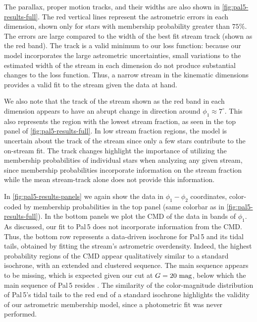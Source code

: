 \documentclass[twocolumn]{aastex631}
\newcommand{\stream}[1]{#1}
\begin{document}
        The parallax, proper motion tracks, and their widths are also shown in
        \autoref{fig:pal5-results-full}. The red vertical lines represent the
        astrometric errors in each dimension, shown only for stars with
        membership probability greater than $75\%$. The errors are large
        compared to the width of the best fit stream track (shown as the red
        band). The track is a valid minimum to our loss function: because our
        model incorporates the large astrometric uncertainties, small variations
        to the estimated width of the stream in each dimension do not produce
        substantial changes to the loss function. Thus, a narrow stream in the
        kinematic dimensions provides a valid fit to the stream given the data
        at hand. 
    
        We also note that the track of the stream shown as the red band in each
        dimension appears to have an abrupt change in direction around $\phi_1
        \approx 7^\circ$. This also represents the region with the lowest stream
        fraction, as seen in the top panel of \autoref{fig:pal5-results-full}.
        In low stream fraction regions, the model is uncertain about the track
        of the stream since only a few stars contribute to the on-stream fit.
        The track changes highlight the importance of utilizing the membership
        probabilities of individual stars when analyzing any given stream, since
        membership probabilities incorporate information on the stream fraction
        while the mean stream-track alone does not provide this information. 
    
        In \autoref{fig:pal5-results-panels} we again show the data in
        $\phi_1-\phi_2$ coordinates, color-coded by membership probabilities in
        the top panel (same colorbar as in \autoref{fig:pal5-results-full}). In
        the bottom panels we plot the CMD of the data in bands of $\phi_1$. As
        discussed, our fit to \stream{Pal\,5} does not incorporate information
        from the CMD.  Thus, the bottom row represents a data-driven isochrone
        for \stream{Pal\,5} and its tidal tails, obtained by fitting the
        stream's astrometric overdensity. Indeed, the highest probability
        regions of the CMD appear qualitatively similar to a standard isochrone,
        with an extended and clustered sequence. The main sequence appears to be
        missing, which is expected given our cut at $G = 20~\rm{mag}$, below
        which the main sequence of \stream{Pal\,5} resides \citep{Bonaca+2020}.
        The similarity of the color-magnitude distribution of \stream{Pal\,5}'s
        tidal tails to the red end of a standard isochrone highlights the
        validity of our astrometric membership model, since a photometric fit
        was never performed. 
\end{document}
